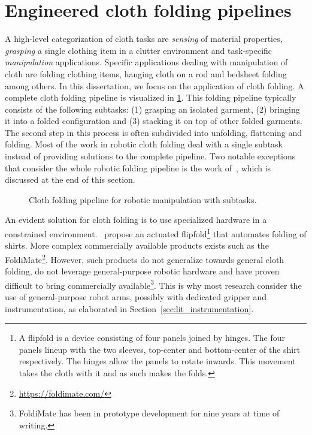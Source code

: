 \section{Engineered cloth folding pipelines} \label{sec:lit_cloth_folding_pipelines}
A high-level categorization of cloth tasks are \emph{sensing} of material properties, \emph{grasping} a single clothing item in a clutter environment and task-specific \emph{manipulation} applications. Specific applications dealing with manipulation of cloth are folding clothing items, hanging cloth on a rod and bedsheet folding among others. In this dissertation, we focus on the application of cloth folding. A complete cloth folding pipeline is visualized in \cref{fig:complete_folding_pipeline}. This folding pipeline typically consists of the following subtasks: (1) grasping an isolated garment, (2) bringing it into a folded configuration and (3) stacking it on top of other folded garments. The second step in this process is often subdivided into unfolding, flattening and folding. Most of the work in robotic cloth folding deal with a single subtask instead of providing solutions to the complete pipeline. Two notable exceptions that consider the whole robotic folding pipeline is the work of~\textcite{Doumanoglou2016,Maitin2010}, which is discussed at the end of this section.
\begin{figure}[htbp!]
    \centering
    
    \caption{Cloth folding pipeline for robotic manipulation with subtasks.}
    \label{fig:complete_folding_pipeline}
\end{figure}

An evident solution for cloth folding is to use specialized hardware in a constrained environment.~\Textcite{Nair2013} propose an actuated flipfold\footnote{A flipfold is a device consisting of four panels joined by hinges. The four panels lineup with the two sleeves, top-center and bottom-center of the shirt respectively. The hinges allow the panels to rotate inwards. This movement takes the cloth with it and as such makes the folds.} that automates folding of shirts. More complex commercially available products exists such as the FoldiMate\footnote{\url{https://foldimate.com/}}. However, such products do not generalize towards general cloth folding, do not leverage general-purpose robotic hardware and have proven difficult to bring commercially available\footnote{FoldiMate has been in prototype development for nine years at time of writing.}. This is why most research consider the use of general-purpose robot arms, possibly with dedicated gripper and instrumentation, as elaborated in Section~\ref{sec:lit_instrumentation}.

